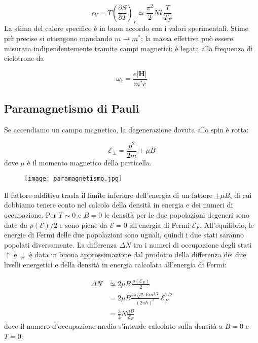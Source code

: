 \documentclass[a4paper]{report}
\begin{document}
\begin{equation}
    c_V = T \left(\frac{\partial S}{\partial T}\right)_{V} \simeq \frac{\pi^2}{2} N k \frac{T}{T_F}
\end{equation}
La stima del calore specifico è in buon accordo con i valori sperimentali. Stime più precise si ottengono mandando $m\to m^{*}$; la massa effettiva può essere misurata indipendentemente tramite campi magnetici: è legata alla frequenza di ciclotrone da 

\begin{equation}
    \omega_c = \frac{e |\mathbf{H}|}{m^{*}c}
\end{equation}

\subsection{Paramagnetismo di Pauli}

Se accendiamo un campo magnetico, la degenerazione dovuta allo spin è rotta:

\begin{equation}
    \mathcal{E}_{\pm} = \frac{p^2}{2m} \pm \mu B
\end{equation}
dove $\mu$ è il momento magnetico della particella. 

\begin{figure}[h!]
    \centering
    \texttt{[image: paramagnetismo.jpg]}
\end{figure}

Il fattore additivo trasla il limite inferiore dell'energia di un fattore $\pm \mu B$, di cui dobbiamo tenere conto nel calcolo della densità in energia e dei numeri di occupazione. Per $T\sim 0$ e $B=0$ le densità per le due popolazioni degeneri sono date da $\rho(\mathcal{E})/2$ e sono piene da $\mathcal{E}=0$ all'energia di Fermi $\mathcal{E}_F$. All'equilibrio, le energie di Fermi delle due popolazioni sono uguali, quindi i due stati saranno popolati diversamente. La differenza $\Delta N$ tra i numeri di occupazione degli stati $\uparrow$ e $\downarrow$ è data in buona approssimazione dal prodotto della differenza dei due livelli energetici e della densità in energia calcolata all'energia di Fermi:

\begin{equation}
\begin{split}
    \Delta N & \simeq 2\mu B \,\frac{\rho(\mathcal{E}_F)}{2} \\
    & = 2 \mu B \frac{4\pi\sqrt{2}\, V\, m^{3/2}}{(2\pi\hbar)^3} \,\mathcal{E}_F^{1/2} \\
    & = \frac{3}{2} N \frac{\mu B}{\mathcal{E}_F}
\end{split}
\end{equation}
dove il numero d'occupazione medio s'intende calcolato sulla densità a $B = 0$ e $T = 0$:
\end{document}
